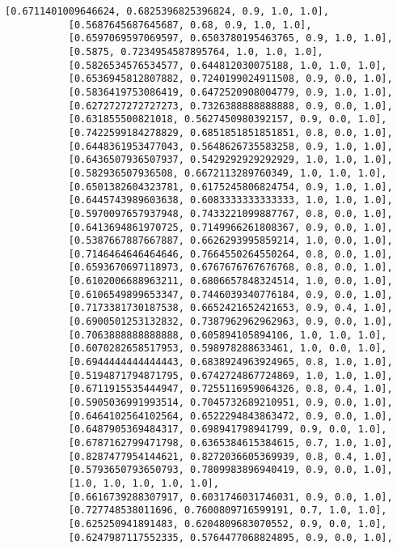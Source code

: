 \documentclass[11pt]{article}
\begin{document}
\begin{Verbatim}[commandchars=\\\{\}]
           [0.6711401009646624, 0.6825396825396824, 0.9, 1.0, 1.0],
           [0.5687645687645687, 0.68, 0.9, 1.0, 1.0],
           [0.6597069597069597, 0.6503780195463765, 0.9, 1.0, 1.0],
           [0.5875, 0.7234954587895764, 1.0, 1.0, 1.0],
           [0.5826534576534577, 0.644812030075188, 1.0, 1.0, 1.0],
           [0.6536945812807882, 0.7240199024911508, 0.9, 0.0, 1.0],
           [0.5836419753086419, 0.6472520908004779, 0.9, 1.0, 1.0],
           [0.6272727272727273, 0.7326388888888888, 0.9, 0.0, 1.0],
           [0.631855500821018, 0.5627450980392157, 0.9, 0.0, 1.0],
           [0.7422599184278829, 0.6851851851851851, 0.8, 0.0, 1.0],
           [0.6448361953477043, 0.5648626735583258, 0.9, 1.0, 1.0],
           [0.6436507936507937, 0.5429292929292929, 1.0, 1.0, 1.0],
           [0.582936507936508, 0.6672113289760349, 1.0, 1.0, 1.0],
           [0.6501382604323781, 0.6175245806824754, 0.9, 1.0, 1.0],
           [0.6445743989603638, 0.6083333333333333, 1.0, 1.0, 1.0],
           [0.5970097657937948, 0.7433221099887767, 0.8, 0.0, 1.0],
           [0.6413694861970725, 0.7149966261808367, 0.9, 0.0, 1.0],
           [0.5387667887667887, 0.6626293995859214, 1.0, 0.0, 1.0],
           [0.7146464646464646, 0.7664550264550264, 0.8, 0.0, 1.0],
           [0.6593670697118973, 0.6767676767676768, 0.8, 0.0, 1.0],
           [0.6102006688963211, 0.6806657848324514, 1.0, 0.0, 1.0],
           [0.6106549899653347, 0.7446039340776184, 0.9, 0.0, 1.0],
           [0.7173381730187538, 0.6652421652421653, 0.9, 0.4, 1.0],
           [0.6900501253132832, 0.7387962962962963, 0.9, 0.0, 1.0],
           [0.7063888888888888, 0.605894105894106, 1.0, 1.0, 1.0],
           [0.6070282658517953, 0.598978288633461, 1.0, 0.0, 1.0],
           [0.6944444444444443, 0.6838924963924965, 0.8, 1.0, 1.0],
           [0.5194871794871795, 0.6742724867724869, 1.0, 1.0, 1.0],
           [0.6711915535444947, 0.7255116959064326, 0.8, 0.4, 1.0],
           [0.5905036991993514, 0.7045732689210951, 0.9, 0.0, 1.0],
           [0.6464102564102564, 0.6522294843863472, 0.9, 0.0, 1.0],
           [0.6487905369484317, 0.698941798941799, 0.9, 0.0, 1.0],
           [0.6787162799471798, 0.6365384615384615, 0.7, 1.0, 1.0],
           [0.8287477954144621, 0.8272036605369939, 0.8, 0.4, 1.0],
           [0.5793650793650793, 0.7809983896940419, 0.9, 0.0, 1.0],
           [1.0, 1.0, 1.0, 1.0, 1.0],
           [0.6616739288307917, 0.6031746031746031, 0.9, 0.0, 1.0],
           [0.727748538011696, 0.7600809716599191, 0.7, 1.0, 1.0],
           [0.625250941891483, 0.6204809683070552, 0.9, 0.0, 1.0],
           [0.6247987117552335, 0.5764477068824895, 0.9, 0.0, 1.0],

\end{Verbatim}
\end{document}
